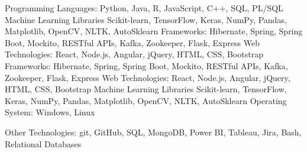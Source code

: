 \begin{cvskills}
  \cvskill
    {Programming Languages:}
    {Python, Java, R, JavaScript,  C++, SQL, PL/SQL}
  {
  \cvskill
    {Machine Learning Libraries}
    {Scikit-learn, TensorFlow, Keras, NumPy, Pandas, Matplotlib, OpenCV, NLTK, AutoSklearn}
  \cvskill
    {Frameworks:}
    {Hibernate, Spring, Spring Boot, Mockito, RESTful APIs, Kafka, Zookeeper, Flask, Express}
  \cvskill
    {Web Technologies:}
    {React, Node.js, Angular, jQuery, HTML, CSS, Bootstrap}
  }
  {
  \cvskill
    {Frameworks:}
    {Hibernate, Spring, Spring Boot, Mockito, RESTful APIs, Kafka, Zookeeper, Flask, Express}
  \cvskill
    {Web Technologies:}
    {React, Node.js, Angular, jQuery, HTML, CSS, Bootstrap}
  \cvskill
    {Machine Learning Libraries}
    {Scikit-learn, TensorFlow, Keras, NumPy, Pandas, Matplotlib, OpenCV, NLTK, AutoSklearn}
  }
  \cvskill
    {Operating System:}
    {Windows,  Linux}
  
    
   
   \cvskill
    {Other Technologies:}
    {git, GitHub, SQL, MongoDB, Power BI, Tableau, Jira, Bash, Relational Databases}
\end{cvskills}